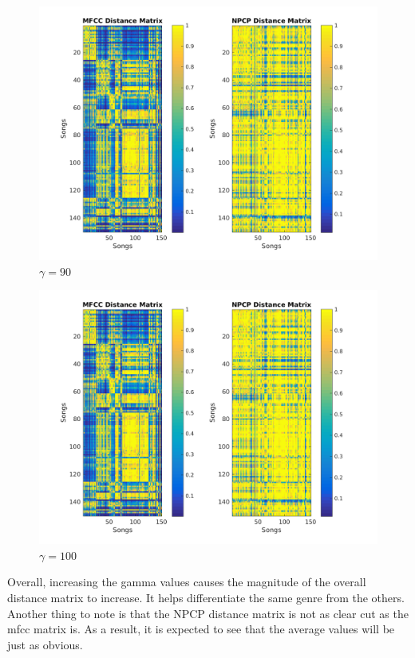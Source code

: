 \documentclass[11pt, a4paper]{article}
\begin{document}
\begin{figure}[H]
\hspace*{-2cm}    
    \centering
    \includegraphics[width=1.25\textwidth]{gamma90.png}
    \caption{$\gamma = 90$}
\end{figure}

\begin{figure}[H]
\hspace*{-2cm}    
    \centering
    \includegraphics[width=1.25\textwidth]{gamma100.png}
    \caption{$\gamma = 100$}
\end{figure}

Overall, increasing the gamma values causes the magnitude of the overall distance matrix to increase. It helps differentiate the same genre from the others. Another thing to note is that the NPCP distance matrix is not as clear cut as the mfcc matrix is. As a result, it is expected to see that the average values will be just as obvious. \\
\end{document}
